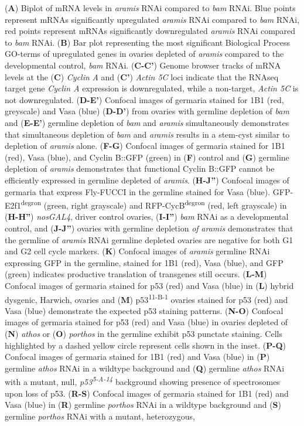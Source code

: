 \documentclass[12pt,oneside]{reedthesis}
\begin{document}
\setlength\parindent{0pt}(\textbf{A}) Biplot of mRNA levels in \emph{aramis} RNAi compared to \emph{bam} RNAi. Blue points represent mRNAs significantly upregulated \emph{aramis} RNAi compared to \emph{bam} RNAi, red points represent mRNAs significantly downregulated \emph{aramis} RNAi compared to \emph{bam} RNAi. (\textbf{B}) Bar plot representing the most significant Biological Process GO-terms of upregulated genes in ovaries depleted of \emph{aramis} compared to the developmental control, \emph{bam} RNAi. (\textbf{C-C'}) Genome browser tracks of mRNA levels at the (\textbf{C}) \emph{Cyclin} \emph{A} and (\textbf{C'}) \emph{Actin 5C} loci indicate that the RNAseq target gene \emph{Cyclin A} expression is downregulated, while a non-target, \emph{Actin 5C} is not downregulated. (\textbf{D-E'}) Confocal images of germaria stained for 1B1 (red, greyscale) and Vasa (blue) (\textbf{D-D'}) from ovaries with germline depletion of \emph{bam} and (\textbf{E-E'}) germline depletion of \emph{bam} and \emph{aramis} simultaneously demonstrates that simultaneous depletion of \emph{bam} and \emph{aramis} results in a stem-cyst similar to depletion of \emph{aramis} alone. (\textbf{F-G}) Confocal images of germaria stained for 1B1 (red), Vasa (blue), and Cyclin B::GFP (green) in (\textbf{F}) control and (\textbf{G}) germline depletion of \emph{aramis} demonstrates that functional Cyclin B::GFP cannot be efficiently expressed in germline depleted of \emph{aramis}. (\textbf{H-J''}) Confocal images of germaria that express Fly-FUCCI in the germline stained for Vasa (blue). GFP-E2f1\textsuperscript{degron} (green, right grayscale) and RFP-CycB\textsuperscript{degron} (red, left grayscale) in (\textbf{H-H''}) \emph{nosGAL4}, driver control ovaries, (\textbf{I-I''}) \emph{bam} RNAi as a developmental control, and (\textbf{J-J''}) ovaries with germline depletion \emph{of} \emph{aramis} demonstrates that the germline of \emph{aramis} RNAi germline depleted ovaries are negative for both G1 and G2 cell cycle markers. (\textbf{K}) Confocal images of \emph{aramis} germline RNAi expressing GFP in the germline, stained for 1B1 (red), Vasa (blue), and GFP (green) indicates productive translation of transgenes still occurs. (\textbf{L-M}) Confocal images of germaria stained for p53 (red) and Vasa (blue) in (\textbf{L}) hybrid dysgenic, Harwich, ovaries and (\textbf{M}) p53\textsuperscript{11-B-1} ovaries stained for p53 (red) and Vasa (blue) demonstrate the expected p53 staining patterns. (\textbf{N-O}) Confocal images of germaria stained for p53 (red) and Vasa (blue) in ovaries depleted of (\textbf{N}) \emph{athos} or (\textbf{O}) \emph{porthos} in the germline exhibit p53 punctate staining. Cells highlighted by a dashed yellow circle represent cells shown in the inset. (\textbf{P-Q}) Confocal images of germaria stained for 1B1 (red) and Vasa (blue) in (\textbf{P}) germline \emph{athos} RNAi in a wildtype background and (\textbf{Q}) germline \emph{athos} RNAi with a mutant, null, \emph{p53\textsuperscript{5-A-14}} background showing presence of spectrosomes upon loss of p53. (\textbf{R-S}) Confocal images of germaria stained for 1B1 (red) and Vasa (blue) in (\textbf{R}) germline \emph{porthos} RNAi in a wildtype background and (\textbf{S}) germline \emph{porthos} RNAi with a mutant, heterozygous, 
\end{document}
